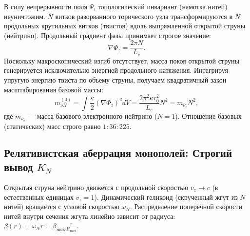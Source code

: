 \documentclass[11pt,a4paper]{article}
\begin{document}
В силу непрерывности поля $\Psi$, топологический инвариант (намотка нитей) неуничтожим. $N$ витков разорванного торического узла трансформируются в $N$ продольных крутильных витков (твистов) вдоль выпрямленной открытой струны (нейтрино). Продольный градиент фазы принимает строгое значение:
\begin{equation}
\nabla \Phi_z = \frac{2\pi N}{L_e}.
\end{equation}
Поскольку макроскопический изгиб отсутствует, масса покоя открытой струны генерируется исключительно энергией продольного натяжения. Интегрируя упругую энергию твиста по объему струны, получаем квадратичный закон масштабирования базовой массы:
\begin{equation}
m_{\nu N}^{(0)} = \int \frac{\kappa}{2} (\nabla \Phi_z)^2 dV = \frac{2\pi^2 \kappa r_0^2}{L_e} N^2 = m_{\nu_e} N^2,
\label{eq:neutrino_n2}
\end{equation}
где $m_{\nu_e}$ — масса базового электронного нейтрино ($N=1$). Отношение базовых (статических) масс строго равно $1 : 36 : 225$.
	
\subsection{Релятивистская аберрация монополей: Строгий вывод $K_N$}
Открытая струна нейтрино движется с продольной скоростью $v_z \to c$ (в естественных единицах $v_z = 1$). Динамический геликоид (скрученный жгут из $N$ нитей) вращается с угловой скоростью $\omega_N$. Распределение поперечной скорости нитей внутри сечения жгута линейно зависит от радиуса: $\beta(r) = \omega_N r = \beta_{\text{max}} \frac{r}{R_{\text{max}}}$.
\end{document}
